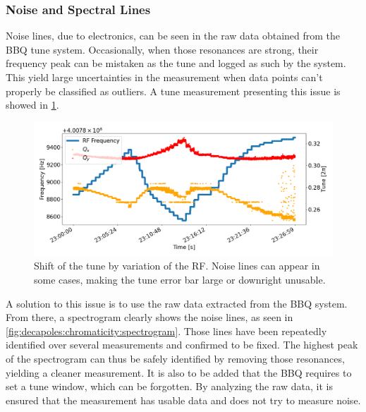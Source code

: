 \subsubsection{Noise and Spectral Lines}

Noise lines, due to electronics, can be seen in the raw data obtained from the BBQ tune system.
Occasionally, when those resonances are strong, their frequency peak can be mistaken as the tune and
logged as such by the system. This yield large uncertainties in the measurement when data points 
can't properly be classified as outliers. A tune measurement presenting this issue is showed in 
\cref{fig:decapoles:chromaticity:noisy_tune}.

\begin{figure}[H]
    \centering
    \includegraphics[width=\textwidth]{./images/noisy_tune.png}
    \caption{Shift of the tune by variation of the RF. Noise lines can appear in some cases,
    making the tune error bar large or downright unusable.}
    \label{fig:decapoles:chromaticity:noisy_tune}
\end{figure}

A solution to this issue is to use the raw data extracted from the BBQ system. From there, a
spectrogram clearly shows the noise lines, as seen in \cref{fig:decapoles:chromaticity:spectrogram}.
Those lines have been repeatedly identified over several measurements and confirmed to be fixed.
The highest peak of the spectrogram can thus be safely identified by removing those resonances,
yielding a cleaner measurement. It is also to be added that the BBQ requires to set a tune window,
which can be forgotten. By analyzing the raw data, it is ensured that the measurement has usable
data and does not try to measure noise.

